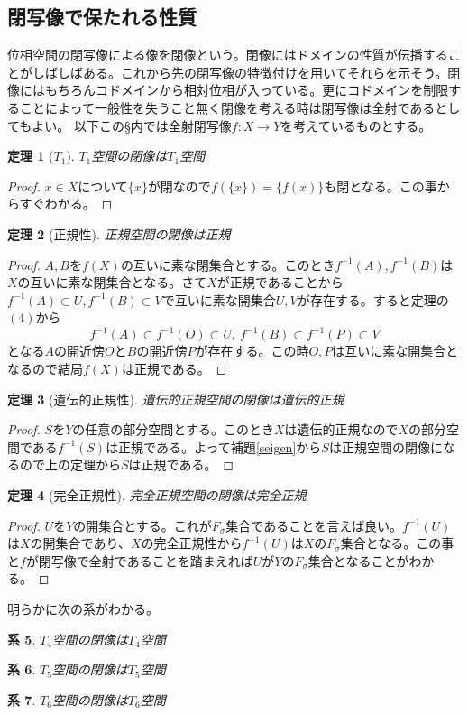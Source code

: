 \documentclass[leqno]{jsarticle}
\newtheorem{thm}{定理}
\newtheorem{cor}[thm]{系}
\begin{document}
\subsection{閉写像で保たれる性質}
位相空間の閉写像による像を閉像という。閉像にはドメインの性質が伝播することがしばしばある。これから先の閉写像の特徴付けを用いてそれらを示そう。閉像にはもちろんコドメインから相対位相が入っている。更にコドメインを制限することによって一般性を失うこと無く閉像を考える時は閉写像は全射であるとしてもよい。
以下この\S 内では全射閉写像$f:X\to Y$を考えているものとする。
\begin{thm}[$T_1$]\label{t1}
$T_1$空間の閉像は$T_1$空間
\end{thm}
\begin{proof}
$x\in X$について$\{x\}$が閉なので$f(\{x\})=\{f(x)\}$も閉となる。この事からすぐわかる。
\end{proof}


\begin{thm}[正規性]
正規空間の閉像は正規
\end{thm}
\begin{proof}
$A,B$を$f(X)$の互いに素な閉集合とする。このとき$f^{-1}(A),f^{-1}(B)$は$X$の互いに素な閉集合となる。さて$X$が正規であることから$f^{-1}(A)\subset U,f^{-1}(B)\subset V$で互いに素な開集合$U,V$が存在する。すると定理の$(4)$から
\[
f^{-1}(A)\subset f^{-1}(O)\subset U,\ f^{-1}(B)\subset f^{-1}(P)\subset V
\]
となる$A$の開近傍$O$と$B$の開近傍$P$が存在する。この時$O,P$は互いに素な開集合となるので結局$f(X)$は正規である。
\end{proof}
\begin{thm}[遺伝的正規性]
遺伝的正規空間の閉像は遺伝的正規

\end{thm}
\begin{proof}
$S$を$Y$の任意の部分空間とする。このとき$X$は遺伝的正規なので$X$の部分空間である$f^{-1}(S)$は正規である。よって補題\ref{seigen}から$S$は正規空間の閉像になるので上の定理から$S$は正規である。
\end{proof}

\begin{thm}[完全正規性]
完全正規空間の閉像は完全正規
\end{thm}
\begin{proof}
$U$を$Y$の開集合とする。これが$F_{\sigma}$集合であることを言えば良い。$f^{-1}(U)$は$X$の開集合であり、$X$の完全正規性から$f^{-1}(U)$は$X$の$F_{\sigma}$集合となる。この事と$f$が閉写像で全射であることを踏まえれば$U$が$Y$の$F_{\sigma}$集合となることがわかる。
\end{proof}
明らかに次の系がわかる。
\begin{cor}\label{t4}
$T_4$空間の閉像は$T_4$空間
\end{cor}
\begin{cor}
$T_5$空間の閉像は$T_5$空間
\end{cor}
\begin{cor}
$T_6$空間の閉像は$T_6$空間
\end{cor}
\end{document}
